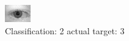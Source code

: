 \begin{figure}[h!]
\begin{center}
\includegraphics[width=0.60\columnwidth]{figures/ID597_class_2_target_3.png}
\end{center}
\caption{ Classification: 2 actual target: 3}
\label{fig:ID597_class_2_target_3}
\end{figure}
